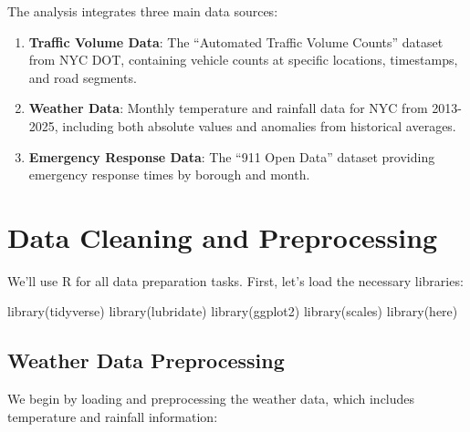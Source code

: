 \documentclass[
  letterpaper,
  DIV=11,
  numbers=noendperiod]{scrreprt}
\newenvironment{Shaded}{\begin{snugshade}}{\end{snugshade}}
\newcommand{\FunctionTok}[1]{\textcolor[rgb]{0.28,0.35,0.67}{#1}}
\newcommand{\NormalTok}[1]{\textcolor[rgb]{0.00,0.23,0.31}{#1}}
\begin{document}
The analysis integrates three main data sources:

\begin{enumerate}
\def\labelenumi{\arabic{enumi}.}
\item
  \textbf{Traffic Volume Data}: The ``Automated Traffic Volume Counts''
  dataset from NYC DOT, containing vehicle counts at specific locations,
  timestamps, and road segments.
\item
  \textbf{Weather Data}: Monthly temperature and rainfall data for NYC
  from 2013-2025, including both absolute values and anomalies from
  historical averages.
\item
  \textbf{Emergency Response Data}: The ``911 Open Data'' dataset
  providing emergency response times by borough and month.
\end{enumerate}

\section{Data Cleaning and
Preprocessing}\label{data-cleaning-and-preprocessing}

We'll use R for all data preparation tasks. First, let's load the
necessary libraries:

\begin{Shaded}
\begin{Highlighting}[]
\FunctionTok{library}\NormalTok{(tidyverse)}
\FunctionTok{library}\NormalTok{(lubridate)}
\FunctionTok{library}\NormalTok{(ggplot2)}
\FunctionTok{library}\NormalTok{(scales)}
\FunctionTok{library}\NormalTok{(here)}
\end{Highlighting}
\end{Shaded}

\subsection{Weather Data
Preprocessing}\label{weather-data-preprocessing}

We begin by loading and preprocessing the weather data, which includes
temperature and rainfall information:
\end{document}
